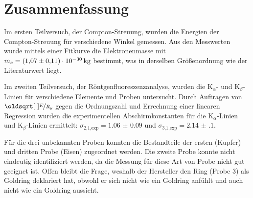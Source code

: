 \documentclass[ngerman]{scrartcl}
\begin{document}
\section{Zusammenfassung}
\label{sec:zusammenfassung}

Im ersten Teilversuch, der Compton-Streuung, wurden die Energien der Compton-Streuung für verschiedene Winkel gemessen. Aus den Messwerten wurde mittels einer Fitkurve die Elektronenmasse mit $m_e = \SI{1.07(11)E-30}{\kilogram}$ bestimmt, was in derselben Größenordnung wie der Literaturwert liegt.

Im zweiten Teilversuch, der Röntgenfluoreszenzanalyse, wurden die K$_{\alpha}$- und K$_{\beta}$-Linien für verschiedene Elemente und Proben untersucht. Durch Auftragen von $\sqrt{\nicefrac{E}{R_y}}$ gegen die Ordnungszahl und Errechnung einer linearen Regression wurden die experimentellen Abschirmkonstanten für die K$_{\alpha}$-Linien und K$_{\beta}$-Linien ermittelt: $\sigma_{\text{2,1,exp}} = \num{1.06(9)}$ und $\sigma_{\text{3,1,exp}} = \num{2.14(10)}$.

Für die drei unbekannten Proben konnten die Bestandteile der ersten (Kupfer) und dritten Probe (Eisen) zugeordnet werden. Die zweite Probe konnte nicht eindeutig identifiziert werden, da die Messung für diese Art von Probe nicht gut geeignet ist. Offen bleibt die Frage, weshalb der Hersteller den Ring (Probe 3) als Goldring deklariert hat, obwohl er sich nicht wie ein Goldring anfühlt und auch nicht wie ein Goldring aussieht.



\clearpage
\printbibliography

\listoffigures

\listoftables
\end{document}
